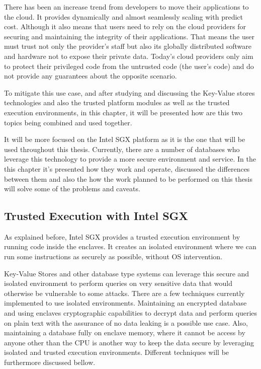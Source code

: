 There has been an increase trend from developers to move their applications to the cloud. It provides dynamically and almost seamlessly scaling with predict cost. Although it also means that users need to rely on the cloud providers for securing and maintaining the integrity of their applications. That means the user must trust not only the provider's staff but also its globally distributed software and hardware not to expose their private data. Today's cloud providers only aim to protect their privileged code from the untrusted code (the user's code) and do not provide any guarantees about the opposite scenario.

To mitigate this use case, and after studying and discussing the Key-Value stores technologies and also the trusted platform modules as well as the trusted execution environments, in this chapter, it will be presented how are this two topics being combined and used together. 

It will be more focused on the Intel SGX platform as it is the one that will be used throughout this thesis. Currently, there are a number of databases who leverage this technology to provide a more secure environment and service. In the this chapter it's presented how they work and operate, discussed the differences between them and also the how the work planned to be performed on this thesis will solve some of the problems and caveats. 


\subsection{Trusted Execution with Intel SGX}
\label{ssec:trusted_execution_with_sgx}

As explained before, Intel SGX provides a trusted execution environment by running code inside the enclaves. It creates an isolated environment where we can run some instructions as securely as possible, without \gls{OS} intervention.

Key-Value Stores and other database type systems can leverage this secure and isolated environment to perform queries on very sensitive data that would otherwise be vulnerable to some attacks. There are a few techniques currently implemented to use isolated environments. Maintaining an encrypted database and using enclaves cryptographic capabilities to decrypt data and perform queries on plain text with the assurance of no data leaking is a possible use case. Also, maintaining a database fully on enclave memory, where it cannot be access by anyone other than the CPU is another way to keep the data secure by leveraging isolated and trusted execution environments. Different techniques will be furthermore discussed bellow. 

